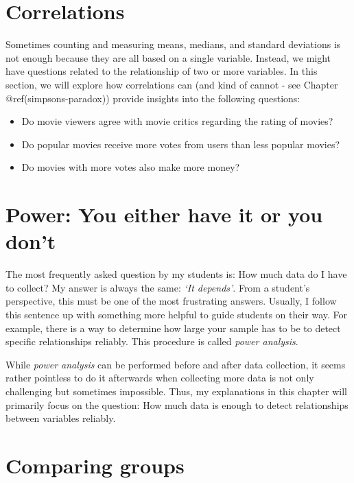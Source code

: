 \documentclass[
  letterpaper,
]{krantz}
\begin{document}

\chapter{Correlations}\label{correlations}

Sometimes counting and measuring means, medians, and standard deviations
is not enough because they are all based on a single variable. Instead,
we might have questions related to the relationship of two or more
variables. In this section, we will explore how correlations can (and
kind of cannot - see Chapter @ref(simpsons-paradox)) provide insights
into the following questions:

\begin{itemize}
\item
  Do movie viewers agree with movie critics regarding the rating of
  movies?
\item
  Do popular movies receive more votes from users than less popular
  movies?
\item
  Do movies with more votes also make more money?
\end{itemize}


\chapter{Power: You either have it or you don't}\label{power-analysis}

The most frequently asked question by my students is: How much data do I
have to collect? My answer is always the same: \emph{`It depends'}. From
a student's perspective, this must be one of the most frustrating
answers. Usually, I follow this sentence up with something more helpful
to guide students on their way. For example, there is a way to determine
how large your sample has to be to detect specific relationships
reliably. This procedure is called \emph{power analysis}.

While \emph{power analysis} can be performed before and after data
collection, it seems rather pointless to do it afterwards when
collecting more data is not only challenging but sometimes impossible.
Thus, my explanations in this chapter will primarily focus on the
question: How much data is enough to detect relationships between
variables reliably.


\chapter{Comparing groups}\label{comparing-groups}
\end{document}
